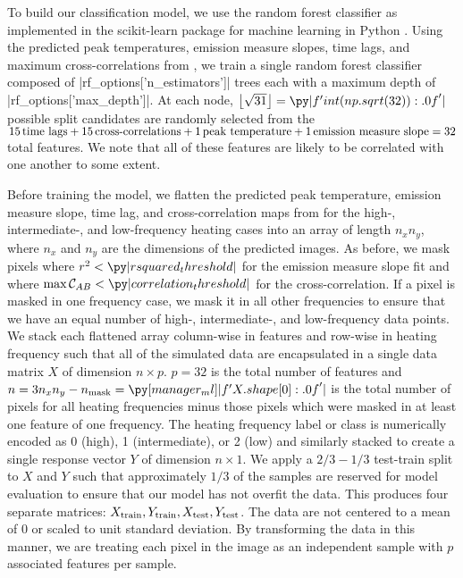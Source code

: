 To build our classification model, we use the random forest classifier as implemented in the scikit-learn package for machine learning in Python \citep{pedregosa_scikit-learn_2011}.
Using the predicted peak temperatures, emission measure slopes, time lags, and maximum cross-correlations from , we train a single random forest classifier composed of \py[manager_ml]|rf_options['n_estimators']| trees each with a maximum depth of \py[manager_ml]|rf_options['max_depth']|.
At each node, $\left\lfloor\sqrt{31}\right\rfloor=\py|f'{int(np.sqrt(32)):.0f}'|$ possible split candidates are randomly selected from the $15\,\textup{time lags} + 15\,\textup{cross-correlations} + 1\,\textup{peak temperature} + 1\,\textup{emission measure slope}=32$ total features.
We note that all of these features are likely to be correlated with one another to some extent.

Before training the model, we flatten the predicted peak temperature, emission measure slope, time lag, and cross-correlation maps from  for the high-, intermediate-, and low-frequency heating cases into an array of length $n_xn_y$, where $n_x$ and $n_y$ are the dimensions of the predicted images.
As before, we mask pixels where $r^2<\py|rsquared_threshold|$ for the emission measure slope fit and where $\max\mathcal{C}_{AB}<\py|correlation_threshold|$ for the cross-correlation.
If a pixel is masked in one frequency case, we mask it in all other frequencies to ensure that we have an equal number of high-, intermediate-, and low-frequency data points.
We stack each flattened array column-wise in features and row-wise in heating frequency such that all of the simulated data are encapsulated in a single data matrix $X$ of dimension $n\times p$.
$p=32$ is the total number of features and $n=3n_xn_y - n_\textup{mask}=\py[manager_ml]|f'{X.shape[0]:.0f}'|$ is the total number of pixels for all heating frequencies minus those pixels which were masked in at least one feature of one frequency.
The heating frequency label or class is numerically encoded as 0 (high), 1 (intermediate), or 2 (low) and similarly stacked to create a single response vector $Y$ of dimension $n\times1$.
We apply a $2/3-1/3$ test-train split to $X$ and $Y$ such that approximately $1/3$ of the samples are reserved for model evaluation to ensure that our model has not overfit the data.
This produces four separate matrices: $X_\textup{train},Y_\textup{train},X_\textup{test},Y_\textup{test}$.
The data are not centered to a mean of 0 or scaled to unit standard deviation.
By transforming the data in this manner, we are treating each pixel in the image as an independent sample with $p$ associated features per sample.

